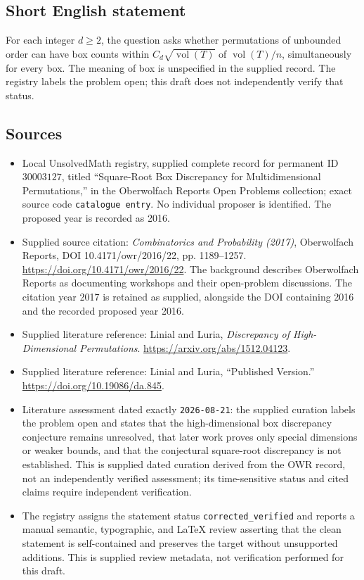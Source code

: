 \documentclass[11pt]{article}
\begin{document}
\subsection{Short English statement}
For each integer \(d\geq2\), the question asks whether permutations of unbounded order can have box counts within \(C_d\sqrt{\operatorname{vol}(T)}\) of \(\operatorname{vol}(T)/n\), simultaneously for every box. The meaning of box is unspecified in the supplied record. The registry labels the problem open; this draft does not independently verify that status.
\subsection{Sources}
\begin{itemize}
\item Local UnsolvedMath registry, supplied complete record for permanent ID \(30003127\), titled ``Square-Root Box Discrepancy for Multidimensional Permutations,'' in the Oberwolfach Reports Open Problems collection; exact source code \texttt{catalogue entry}. No individual proposer is identified. The proposed year is recorded as 2016.
\item Supplied source citation: \emph{Combinatorics and Probability (2017)}, Oberwolfach Reports, DOI 10.4171/owr/2016/22, pp. 1189--1257. \url{https://doi.org/10.4171/owr/2016/22}. The background describes Oberwolfach Reports as documenting workshops and their open-problem discussions. The citation year 2017 is retained as supplied, alongside the DOI containing 2016 and the recorded proposed year 2016.
\item Supplied literature reference: Linial and Luria, \emph{Discrepancy of High-Dimensional Permutations}. \url{https://arxiv.org/abs/1512.04123}.
\item Supplied literature reference: Linial and Luria, ``Published Version.'' \url{https://doi.org/10.19086/da.845}.
\item Literature assessment dated exactly \texttt{2026-08-21}: the supplied curation labels the problem open and states that the high-dimensional box discrepancy conjecture remains unresolved, that later work proves only special dimensions or weaker bounds, and that the conjectural square-root discrepancy is not established. This is supplied dated curation derived from the OWR record, not an independently verified assessment; its time-sensitive status and cited claims require independent verification.
\item The registry assigns the statement status \texttt{corrected\_verified} and reports a manual semantic, typographic, and LaTeX review asserting that the clean statement is self-contained and preserves the target without unsupported additions. This is supplied review metadata, not verification performed for this draft.
\end{itemize}
\end{document}
